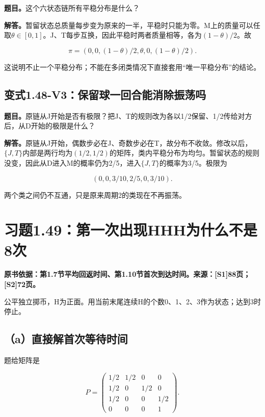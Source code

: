 \documentclass[
  11pt,
  a4paper,
  UTF8,
  fontset=fandol]{ctexart}
\begin{document}
\textbf{题目。}这个六状态链所有平稳分布是什么？

\textbf{解答。}暂留状态总质量每步变为原来的一半，平稳时只能为零。M上的质量可以任取\(\theta\in[0,1]\)。J、T每步互换，因此平稳时两者质量相等，各为\((1-\theta)/2\)。故

\[
\boxed{\pi=(0,0,(1-\theta)/2,\theta,0,(1-\theta)/2).}
\]

这说明不止一个平稳分布；不能在多闭类情况下直接套用``唯一平稳分布''的结论。

\subsection{变式1.48-V3：保留球一回合能消除振荡吗}\label{ux53d8ux5f0f1.48-v3ux4fddux7559ux7403ux4e00ux56deux5408ux80fdux6d88ux9664ux632fux8361ux5417}

\textbf{题目。}原链从J开始是否有极限？把J、T的规则改为各以1/2保留、1/2传给对方后，从D开始的极限是什么？

\textbf{解答。}原链从J开始，偶数步必在J、奇数步必在T，故分布不收敛。修改以后，\(\{J,T\}\)内部是两行均为\((1/2,1/2)\)的矩阵，类内平稳分布为均匀。暂留状态的规则没变，因此从D进入M的概率仍为2/5，进入\(\{J,T\}\)的概率为3/5。极限为

\[
\boxed{(0,0,3/10,2/5,0,3/10).}
\]

两个类之间仍不互通，只是原来周期2的类现在不再振荡。

\section{习题1.49：第一次出现HHH为什么不是8次}\label{ux4e60ux98981.49ux7b2cux4e00ux6b21ux51faux73b0hhhux4e3aux4ec0ux4e48ux4e0dux662f8ux6b21}

\textbf{原书依据：第1.7节平均回返时间、第1.10节首次到达时间。来源：{[}S1{]}88页；{[}S2{]}72页。}

公平独立掷币，H为正面。用当前末尾连续H的个数0、1、2、3作为状态；达到3时停止。

\subsection{（a）直接解首次等待时间}\label{aux76f4ux63a5ux89e3ux9996ux6b21ux7b49ux5f85ux65f6ux95f4}

题给矩阵是

\[
P=\begin{pmatrix}
1/2&1/2&0&0\\1/2&0&1/2&0\\1/2&0&0&1/2\\0&0&0&1
\end{pmatrix}.
\]
\end{document}
